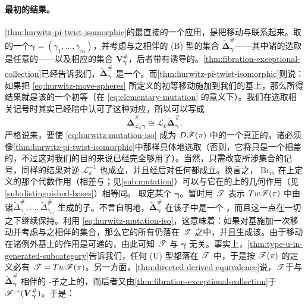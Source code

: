 \paragraph{最初的结果。}\label{sub:first-consequences}
\cref{thm:hurwitz-pi-twist-isomorphic}的最直接的一个应用，是把\trHurwitz{}移动与\trMutation{}联系起来。取\trVanishingPath{}的一个\trDistinguishedBasis{}$\boldsymbol{\gamma}=(\gamma_1,\ldots,\gamma_m)$，并考虑与之相伴的 (B) 型\trEquivariant\trBrane{}的集合 $\widetilde{\boldsymbol{\Delta}}^{\#}_{\boldsymbol{\gamma}}$——其中诸\trGrading{}的选取是任意的——以及相应的\trVanishingCycle{}集合 $\boldsymbol{V}^{\#}_{\boldsymbol{\gamma}}$，后者带有诱导的\trBraneStructure。\cref{thm:fibration-exceptional-collection}已经告诉我们，$\widetilde{\boldsymbol{\Delta}}^{\#}_{\boldsymbol{\gamma}}$ 是一个\trExceptionalCollection。而\cref{thm:hurwitz-pi-twist-isomorphic}则说：如果把 \eqref{eq:hurwitz-move-spheres} 所定义的初等\trHurwitz{}移动施加到我们的基上，那么所得结果就是该\trExceptionalCollection{}的一个初等\trMutation{}（在 \eqref{eq:elementary-mutation} 的意义下）。我们在选取相关记号时其实已经暗中认可了这种对应，所以可以写成
\begin{equation}\label{eq:hurwitz-mutation-iso}
\widetilde{\boldsymbol{\Delta}}^{\#}_{\mathscr{L}_k\boldsymbol{\gamma}}\cong\mathscr{L}_k\widetilde{\boldsymbol{\Delta}}^{\#}_{\boldsymbol{\gamma}}.
\end{equation}
严格说来，要使 \eqref{eq:hurwitz-mutation-iso} 成为 $D\mathscr{F}(\pi)$ 中\trExceptionalCollection{}的一个真正的\trIsomorphism，诸\trGrading{}必须像\cref{thm:hurwitz-pi-twist-isomorphic}中那样具体地选取（否则，它将只是一个相差\trTranslation{}的\trIsomorphism，不过这对我们的目的来说已经完全够用了）。当然，只需改变所涉集合的记号，同样的结果对逆 $\mathscr{L}_k^{-1}$ 也成立，并且经\trComposition{}后对任何\trMutation{}都成立。换言之，\trBraidGroup{} $\mathrm{Br}_m$ 在\trExceptionalCollection{}上定义的那个代数作用（相差\trTranslation{}与\trIsomorphism；见\cref{sub:mutation}）可以与它在\trVanishingPath{}的\trDistinguishedBasis{}上的几何作用（见\cref{sub:distinguished-bases}）相等同。
取定某个 $\boldsymbol{\gamma}$。暂时用 $\mathscr{T}$ 表示 $Tw\mathscr{F}(\pi)$ 中由诸\trObject{}$\widetilde{\Delta}^{\#}_{\gamma_1},\ldots,\widetilde{\Delta}^{\#}_{\gamma_m}$ 生成的\trTriangulated{}子\trCategory。不言自明地，$\widetilde{\boldsymbol{\Delta}}^{\#}_{\boldsymbol{\gamma}}$ 在该子\trCategory{}中是一个\trFull{} \trExceptionalCollection，而且这一点在一切\trMutation{}之下继续保持。利用 \eqref{eq:hurwitz-mutation-iso}，这意味着：如果对基施加一次\trHurwitz{}移动并考虑与之相伴的集合，那么它的所有\trObject{}仍落在 $\mathscr{T}$ 之中，并且生成该\trCategory。由于\trHurwitz{}移动在诸例外基上的作用是可递的，由此可知 $\mathscr{T}$ 与 $\boldsymbol{\gamma}$ 无关。事实上，\cref{thm:type-u-in-generated-subcategory}告诉我们，任何 (U) 型\trEquivariant\trBrane{}都落在 $\mathscr{T}$ 中，于是按 $\mathscr{F}(\pi)$ 的定义必有 $\mathscr{T}=Tw\mathscr{F}(\pi)$。另一方面，\cref{thm:directed-derived-equivalence}说，$\mathscr{T}$\trQuasiequivalent{}于与 $\widetilde{\boldsymbol{\Delta}}^{\#}_{\boldsymbol{\gamma}}$ 相伴的\trDirected{} \trAinfty-子\trCategory{}之上的\trTwistedComplex\trCategory，而后者又由\cref{thm:fibration-exceptional-collection}\trQuasiisomorphic{}于 $\mathscr{F}^{\rightarrow}(\boldsymbol{V}^{\#}_{\boldsymbol{\gamma}})$。于是：
